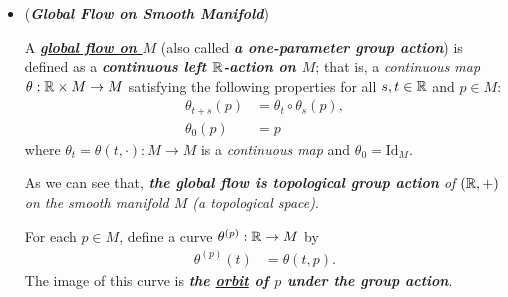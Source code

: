 \documentclass[11pt]{article}
\begin{document}
\begin{itemize}
\item \begin{example}(\emph{\textbf{Global Flow on Smooth Manifold}}) \citep{lee2003introduction}
 \begin{definition}
A \underline{\emph{\textbf{global flow on $M$}}} (also called \textbf{\emph{a one-parameter group action}}) is defined as a \emph{\textbf{continuous left ${\mathbb R}$-action on $M$}}; that is, a \emph{continuous map} $\theta:  {\mathbb R} \times M \rightarrow M$ satisfying the following properties for all $s, t \in {\mathbb R}$ and $p \in M$:
\begin{align*}
\theta_{t+s}(p) &= \theta_t \circ \theta_s(p), \\
\theta_0(p)&= p 
\end{align*} where $\theta_t = \theta(t, \cdot): M \rightarrow M$ is a \emph{continuous map} and $\theta_0 = \text{Id}_{M}$. 
\end{definition}
As we can see that, \emph{\textbf{the global flow is topological group action} of $({\mathbb R}, +)$ on the smooth manifold $M$ (a topological space)}.

 \begin{definition}
For each $p \in M$, define a curve $\theta^{(p)}: {\mathbb R} \rightarrow M$ by
\begin{align*}
\theta^{(p)}(t) &= \theta(t, p).
\end{align*} The image of this curve is \emph{\textbf{the \underline{orbit} of $p$ under the group action}}.
\end{definition}
\end{example}
\end{itemize}

\newpage


\end{document}
